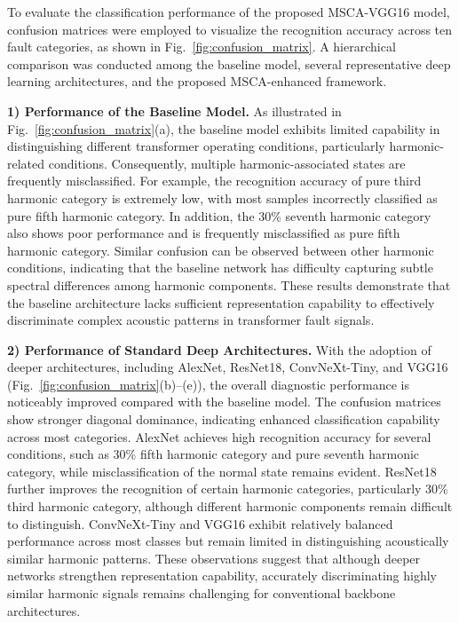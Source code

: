 \documentclass[journal]{IEEEtran}
\begin{document}
To evaluate the classification performance of the proposed MSCA-VGG16 model, confusion matrices were employed to visualize the recognition accuracy across ten fault categories, as shown in Fig.~\ref{fig:confusion_matrix}. A hierarchical comparison was conducted among the baseline model, several representative deep learning architectures, and the proposed MSCA-enhanced framework. 

\textbf{1) Performance of the Baseline Model.}
As illustrated in Fig.~\ref{fig:confusion_matrix}(a), the baseline model exhibits limited capability in distinguishing different transformer operating conditions, particularly harmonic-related conditions. Consequently, multiple harmonic-associated states are frequently misclassified. For example, the recognition accuracy of pure third harmonic category is extremely low, with most samples incorrectly classified as pure fifth harmonic category. In addition, the 30\% seventh harmonic category also shows poor performance and is frequently misclassified as pure fifth harmonic category. Similar confusion can be observed between other harmonic conditions, indicating that the baseline network has difficulty capturing subtle spectral differences among harmonic components. These results demonstrate that the baseline architecture lacks sufficient representation capability to effectively discriminate complex acoustic patterns in transformer fault signals.

\textbf{2) Performance of Standard Deep Architectures.}
With the adoption of deeper architectures, including AlexNet, ResNet18, ConvNeXt-Tiny, and VGG16 (Fig.~\ref{fig:confusion_matrix}(b)–(e)), the overall diagnostic performance is noticeably improved compared with the baseline model. The confusion matrices show stronger diagonal dominance, indicating enhanced classification capability across most categories. AlexNet achieves high recognition accuracy for several conditions, such as 30\% fifth harmonic category and pure seventh harmonic category, while misclassification of the normal state remains evident. ResNet18 further improves the recognition of certain harmonic categories, particularly 30\% third harmonic category, although different harmonic components remain difficult to distinguish. ConvNeXt-Tiny and VGG16 exhibit relatively balanced performance across most classes but remain limited in distinguishing acoustically similar harmonic patterns. These observations suggest that although deeper networks strengthen representation capability, accurately discriminating highly similar harmonic signals remains challenging for conventional backbone architectures.
\end{document}
